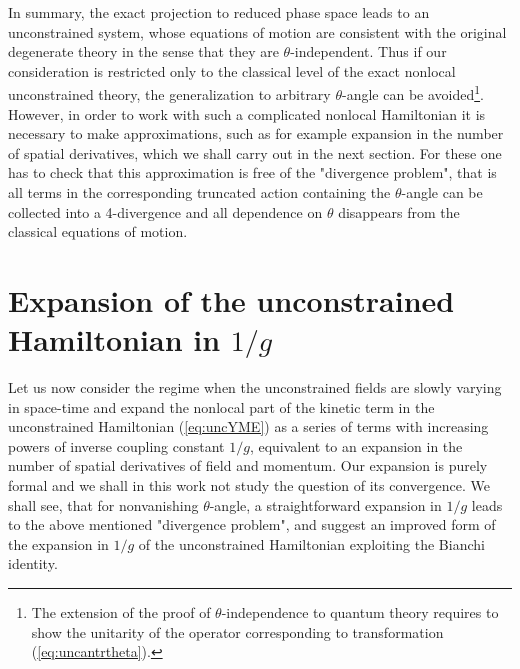 \documentclass[a4paper,12pt]{article}
\begin{document}
In summary, the exact projection to reduced phase space leads to an
unconstrained system,
whose equations of motion are consistent with the original degenerate theory
in the sense that they are $\theta$-independent.
Thus if our consideration is restricted only to
the classical level of the exact nonlocal unconstrained theory, the
generalization to arbitrary $\theta$-angle can be avoided\footnote{
The extension of the proof of $\theta$-independence to
quantum theory requires to show the unitarity of
the operator corresponding to transformation
(\ref{eq:uncantrtheta}).}.
However, in order to work with such a complicated nonlocal
Hamiltonian it is necessary to make approximations, such as for example
expansion in the number of spatial derivatives, which we shall carry
out in the next section.
For these one has to check that this approximation
is free of the "divergence problem", that is all terms in the corresponding
truncated action containing the $\theta$-angle can be collected into a
4-divergence and all dependence on $\theta$
disappears from the classical equations of motion.


\section{Expansion of the unconstrained Hamiltonian in $1/g$}


\label{secIV}

Let us now consider the regime when the unconstrained
fields are slowly varying in space-time and expand
the nonlocal part of the kinetic term in the unconstrained
Hamiltonian (\ref{eq:uncYME}) as a series of terms with increasing
powers of inverse coupling constant $1/g$,
equivalent to an expansion in the
number of spatial derivatives of field and momentum.
Our expansion is purely formal and we shall in this work not
study the question of its convergence.
We shall see, that for nonvanishing $\theta$-angle,
a straightforward expansion in $1/g$ leads to the above mentioned
"divergence problem", and suggest an
improved form of the expansion in $1/g$ of the unconstrained Hamiltonian
exploiting the Bianchi identity.
\end{document}
